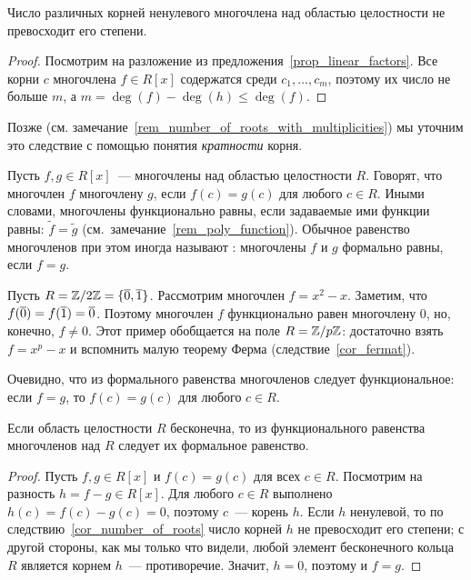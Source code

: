 \begin{corollary}\label{cor_number_of_roots}
Число различных корней ненулевого многочлена над областью целостности
не превосходит его степени.
\end{corollary}
\begin{proof}
Посмотрим на разложение из предложения~\ref{prop_linear_factors}.
Все корни $c$ многочлена $f\in R[x]$ содержатся среди $c_1,\dots,c_m$,
поэтому их число не больше $m$, а $m=\deg(f)-\deg(h)\leq\deg(f)$.
\end{proof}

Позже (см. замечание~\ref{rem_number_of_roots_with_multiplicities}) мы
уточним это следствие с помощью понятия {\it кратности} корня.

\begin{definition}
Пусть $f,g\in R[x]$~--- многочлены над областью целостности
$R$. Говорят, что многочлен $f$   многочлену $g$,
если $f(c)=g(c)$ для
любого $c\in R$. Иными словами, многочлены функционально равны, если
задаваемые ими функции равны: $\widetilde{f}=\widetilde{g}$
(см.~замечание~\ref{rem_poly_function}). Обычное равенство многочленов
при этом иногда называют
:
многочлены $f$ и $g$ формально равны, если $f=g$.
\end{definition}

\begin{example}
Пусть $R=\mathbb Z/2\mathbb Z=\{\overline{0},\overline{1}\}$. Рассмотрим многочлен
$f=x^2-x$. Заметим, что $f(\overline{0})=f(\overline{1})=\overline{0}$. Поэтому
многочлен $f$ функционально равен многочлену $0$, но, конечно, $f\neq
0$. Этот пример обобщается на поле $R=\mathbb Z/p\mathbb Z$: достаточно взять
$f=x^p-x$ и вспомнить малую теорему Ферма
(следствие~\ref{cor_fermat}).
\end{example}

\begin{remark}
Очевидно, что из формального равенства многочленов следует
функциональное: если $f=g$, то $f(c)=g(c)$ для любого $c\in R$.
\end{remark}

\begin{theorem}
Если область целостности $R$ бесконечна, то из функционального
равенства многочленов над $R$ следует их формальное равенство.
\end{theorem}
\begin{proof}
Пусть $f,g\in R[x]$ и $f(c)=g(c)$ для всех $c\in R$. Посмотрим на
разность $h=f-g\in R[x]$. Для любого $c\in R$ выполнено
$h(c)=f(c)-g(c)=0$, поэтому $c$~--- корень $h$. Если $h$ ненулевой, то
по следствию~\ref{cor_number_of_roots} число корней $h$ не превосходит
его степени; с другой стороны, как мы только что видели, любой элемент
бесконечного кольца $R$ является корнем $h$~--- противоречие. Значит,
$h=0$, поэтому и $f=g$.
\end{proof}

